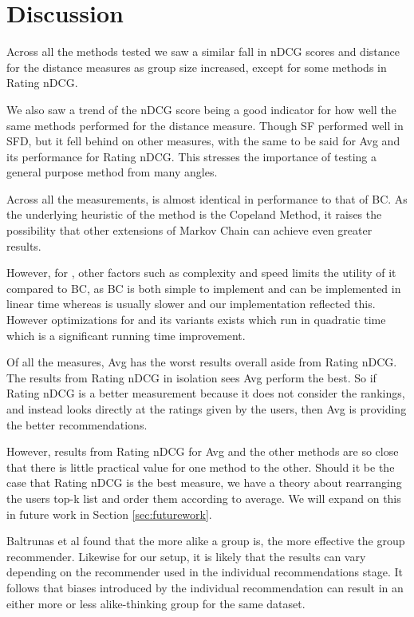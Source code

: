 \section{Discussion} \label{sec:discussion}
Across all the methods tested we saw a similar fall in nDCG scores and distance for the distance measures as group size increased, except for some methods in Rating nDCG.

We also saw a trend of the nDCG score being a good indicator for how well the same  methods performed for the distance measure. Though SF performed well in SFD, but it fell behind on other measures, with the same to be said for Avg and its performance for Rating nDCG. This stresses the importance of testing a general purpose method from many angles.

Across all the measurements, \MC is almost identical in performance to that of BC. As the underlying heuristic of the \MC method is the Copeland Method, it raises the possibility that other extensions of Markov Chain can achieve even greater results.

However, for \MC, other factors such as complexity and speed limits the utility of it compared to BC, as BC is both simple to implement and can be implemented in linear time whereas \MC is usually slower and our implementation reflected this. However optimizations for \MC and its variants exists which run in quadratic time which is a significant running time improvement\cite{rank:aggregation}.

Of all the measures, Avg has the worst results overall aside from Rating nDCG. The results from Rating nDCG in isolation sees Avg perform the best. So if Rating nDCG is a better measurement because it does not consider the rankings, and instead looks directly at the ratings given by the users, then Avg is providing the better recommendations.

However, results from Rating nDCG for Avg and the other methods are so close that there is little practical value for one method to the other. Should it be the case that Rating nDCG is the best measure, we have a theory about rearranging the users top-k list and order them according to average. We will expand on this in future work in Section \ref{sec:futurework}.

Baltrunas et al found that the more alike a group is, the more effective the group recommender\cite{Baltrunas:2010:GRR:1864708.1864733}. Likewise for our setup, it is likely that the results can vary depending on the recommender used in the individual recommendations stage. It follows that biases introduced by the individual recommendation can result in an either more or less alike-thinking group for the same dataset.

